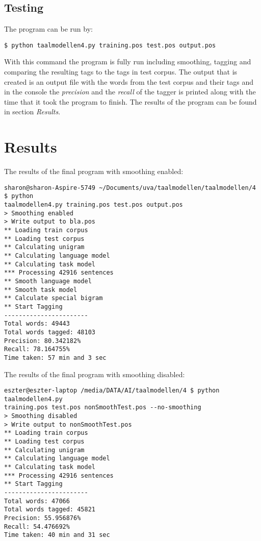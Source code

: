 \documentclass[10pt, a4paper]{article}
\begin{document}
\subsection*{Testing}
The program can be run by:
\begin{verbatim}
$ python taalmodellen4.py training.pos test.pos output.pos
\end{verbatim}

With this command the program is fully run including smoothing, tagging and comparing the resulting tags to the tags in test corpus. The output that is created is an output file with the words from the test corpus and their tags and in the console the \textit{precision} and the \textit{recall} of the tagger is printed along with the time that it took the program to finish. The results of the program can be found in section \textit{Results}.

\section*{Results}

\noindent The results of the final program with smoothing enabled:
\begin{verbatim}
sharon@sharon-Aspire-5749 ~/Documents/uva/taalmodellen/taalmodellen/4 $ python 
taalmodellen4.py training.pos test.pos output.pos
> Smoothing enabled
> Write output to bla.pos
** Loading train corpus
** Loading test corpus
** Calculating unigram
** Calculating language model
** Calculating task model
*** Processing 42916 sentences
** Smooth language model
** Smooth task model
** Calculate special bigram
** Start Tagging
-----------------------
Total words: 49443
Total words tagged: 48103
Precision: 80.342182%
Recall: 78.164755%
Time taken: 57 min and 3 sec
\end{verbatim}

\noindent The results of the final program with smoothing disabled:
\begin{verbatim}
eszter@eszter-laptop /media/DATA/AI/taalmodellen/4 $ python taalmodellen4.py 
training.pos test.pos nonSmoothTest.pos --no-smoothing
> Smoothing disabled
> Write output to nonSmoothTest.pos
** Loading train corpus
** Loading test corpus
** Calculating unigram
** Calculating language model
** Calculating task model
*** Processing 42916 sentences
** Start Tagging
-----------------------
Total words: 47066
Total words tagged: 45821
Precision: 55.956876%
Recall: 54.476692%
Time taken: 40 min and 31 sec
\end{verbatim}
\end{document}
